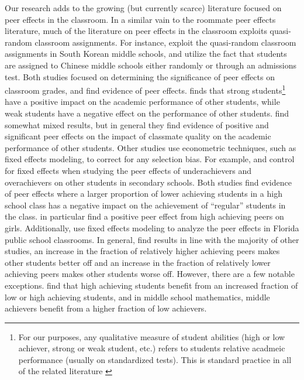 \documentclass[12pt,letterpaper,english,fleqn]{article}
\begin{document}
Our research adds to the growing (but currently scarce) literature focused on peer effects in the classroom.
In a similar vain to the roommate peer effects literature, much of the literature on peer effects in the classroom exploits quasi-random classroom assignments.
For instance, \citet{kang2007classroom} exploit the quasi-random classroom assignments in South Korean middle schools, and \citet{carman2012classroom} utilize the fact that students are assigned to Chinese middle schools either randomly or through an admissions test.
Both studies focused on determining the significance of peer effects on classroom grades, and find evidence of peer effects.
\citeauthor{kang2007classroom} finds that strong students\footnote{For our purposes, any qualitative measure of student abilities (high or low achiever, strong or weak student, etc.) refers to students relative acadmeic performance (usually on standardized tests). This is standard practice in all of the related literature \citep{carman2012classroom,burke2013classroom,kang2007classroom,schlosser2008inside,lavy2012good}} have a positive impact on the academic performance of other students, while weak students have a negative effect on the performance of other students. 
\citeauthor{carman2012classroom} find somewhat mixed results, but in general they find evidence of positive and significant peer effects on the impact of classmate quality on the academic performance of other students.
Other studies use econometric techniques, such as fixed effects modeling, to correct for any selection bias.
For example, \citet{schlosser2008inside} and \citet{lavy2012good} control for fixed effects when studying the peer effects of underachievers and overachievers on other students in secondary schools.
Both studies find evidence of peer effects where a larger proportion of lower achieving students in a high school class has a negative impact on the achievement of ``regular'' students in the class.
\citeauthor{lavy2012good} in particular find a positive peer effect from high achieving peers on girls.
Additionally, \citet{burke2013classroom} use fixed effects modeling to analyze the peer effects in Florida public school classrooms.
In general, \citeauthor{burke2013classroom} find results in line with the majority of other studies, an increase in the fraction of relatively higher achieving peers makes other students better off and an increase in the fraction of relatively lower achieving peers makes other students worse off.
However, there are a few notable exceptions.
\citeauthor{burke2013classroom} find that high achieving students benefit from an increased fraction of low or high achieving students, and in middle school mathematics, middle achievers benefit from a higher fraction of low achievers.
\end{document}

